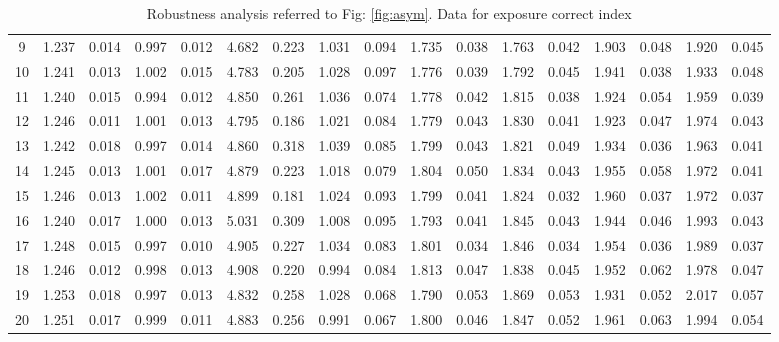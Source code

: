 \documentclass{article}
\begin{document}
\begin{table}[H]
{\begin{tabular}{|c|c|c|c|c|c|c|c|c|c|c|c|c|c|c|c|c|}
     9 & 1.237 & 0.014 & 0.997 & 0.012 & 4.682 & 0.223 & 1.031 & 0.094 & 1.735 & 0.038 & 1.763 & 0.042 & 1.903 & 0.048 & 1.920 & 0.045 \\ 
    10 & 1.241 & 0.013 & 1.002 & 0.015 & 4.783 & 0.205 & 1.028 & 0.097 & 1.776 & 0.039 & 1.792 & 0.045 & 1.941 & 0.038 & 1.933 & 0.048 \\ 
    11 & 1.240 & 0.015 & 0.994 & 0.012 & 4.850 & 0.261 & 1.036 & 0.074 & 1.778 & 0.042 & 1.815 & 0.038 & 1.924 & 0.054 & 1.959 & 0.039 \\ 
    12 & 1.246 & 0.011 & 1.001 & 0.013 & 4.795 & 0.186 & 1.021 & 0.084 & 1.779 & 0.043 & 1.830 & 0.041 & 1.923 & 0.047 & 1.974 & 0.043 \\ 
    13 & 1.242 & 0.018 & 0.997 & 0.014 & 4.860 & 0.318 & 1.039 & 0.085 & 1.799 & 0.043 & 1.821 & 0.049 & 1.934 & 0.036 & 1.963 & 0.041 \\ 
    14 & 1.245 & 0.013 & 1.001 & 0.017 & 4.879 & 0.223 & 1.018 & 0.079 & 1.804 & 0.050 & 1.834 & 0.043 & 1.955 & 0.058 & 1.972 & 0.041 \\ 
    15 & 1.246 & 0.013 & 1.002 & 0.011 & 4.899 & 0.181 & 1.024 & 0.093 & 1.799 & 0.041 & 1.824 & 0.032 & 1.960 & 0.037 & 1.972 & 0.037 \\ 
    16 & 1.240 & 0.017 & 1.000 & 0.013 & 5.031 & 0.309 & 1.008 & 0.095 & 1.793 & 0.041 & 1.845 & 0.043 & 1.944 & 0.046 & 1.993 & 0.043 \\ 
    17 & 1.248 & 0.015 & 0.997 & 0.010 & 4.905 & 0.227 & 1.034 & 0.083 & 1.801 & 0.034 & 1.846 & 0.034 & 1.954 & 0.036 & 1.989 & 0.037 \\ 
    18 & 1.246 & 0.012 & 0.998 & 0.013 & 4.908 & 0.220 & 0.994 & 0.084 & 1.813 & 0.047 & 1.838 & 0.045 & 1.952 & 0.062 & 1.978 & 0.047 \\ 
    19 & 1.253 & 0.018 & 0.997 & 0.013 & 4.832 & 0.258 & 1.028 & 0.068 & 1.790 & 0.053 & 1.869 & 0.053 & 1.931 & 0.052 & 2.017 & 0.057 \\ 
    20 & 1.251 & 0.017 & 0.999 & 0.011 & 4.883 & 0.256 & 0.991 & 0.067 & 1.800 & 0.046 & 1.847 & 0.052 & 1.961 & 0.063 & 1.994 & 0.054 \\ 
   \hline
\end{tabular}
}

\caption{Robustness analysis referred to Fig: \ref{fig:asym}. Data for exposure correct index}
\label{tab:asym_prox}
\end{table}
\end{document}

